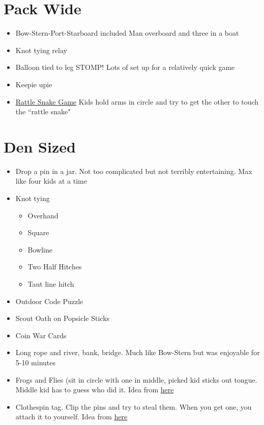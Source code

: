 \documentclass{exam}
\begin{document}
\section{Pack Wide}
\begin{itemize}
\item Bow-Stern-Port-Starboard included Man overboard and three in a boat
\item Knot tying relay
\item Balloon tied to leg STOMP!  Lots of set up for a relatively quick game
\item Keepie upie
\item \underline{\href{https://cubscoutideas.com/139/rattlesnake-game/}{Rattle Snake Game}} Kids hold arms in circle and try to get the other to touch the ``rattle snake"
\end{itemize}
\section{Den Sized}
\begin{itemize}
\item Drop a pin in a jar.  Not too complicated but not terribly entertaining.  Max like four kids at a time
\item Knot tying
\begin{itemize}
\item Overhand
\item Square
\item Bowline
\item Two Half Hitches
\item Taut line hitch
\end{itemize}
\item Outdoor Code Puzzle
\item Scout Oath on Popsicle Sticks
\item Coin War Cards
\item Long rope and river, bank, bridge.  Much like Bow-Stern but was enjoyable for 5-10 minutes
\item Frogs and Flies (sit in circle with one in middle, picked kid sticks out tongue.  Middle kid has to guess who did it.  Idea from \href{https://www.boyscouttrail.com/content/game/frogs\_and\_flies-521.asp}{here}
\item Clothespin tag.  Clip the pins and try to steal them.  When you get one, you attach it to yourself.  Idea from \href{https://www.boyscouttrail.com/content/game/clothespin\_tag-1465.asp}{here}
\end{itemize}
\end{document}
